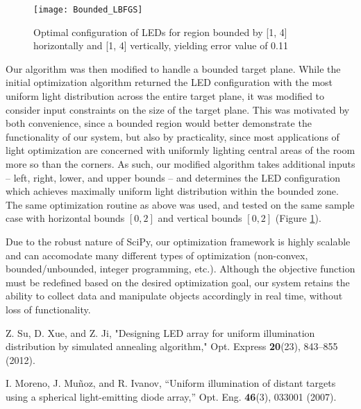 \documentclass[a4paper]{article}
\begin{document}
\begin{figure}[t]
    \centering
    \texttt{[image: Bounded\_LBFGS]}
    \caption{Optimal configuration of LEDs for region bounded by [1, 4] horizontally and [1, 4] vertically, yielding error value of 0.11}
    \label{bounded_solution}
\end{figure}

Our algorithm was then modified to handle a bounded target plane. While the initial optimization algorithm returned the LED configuration with the most uniform light distribution across the entire target plane, it was modified to consider input constraints on the size of the target plane. This was motivated by both convenience, since a bounded region would better demonstrate the functionality of our system, but also by practicality, since most applications of light optimization are concerned with uniformly lighting central areas of the room more so than the corners. As such, our modified algorithm takes additional inputs -- left, right, lower, and upper bounds -- and determines the LED configuration which achieves maximally uniform light distribution within the bounded zone. The same optimization routine as above was used, and tested on the same sample case with horizontal bounds $[0, 2]$ and vertical bounds $[0, 2]$ (Figure \ref{bounded_solution}).

Due to the robust nature of SciPy, our optimization framework is highly scalable and can accomodate many different types of optimization (non-convex, bounded/unbounded, integer programming, etc.). Although the objective function must be redefined based on the desired optimization goal, our system retains the ability to collect data and manipulate objects accordingly in real time, without loss of functionality.











\medskip
 
\begin{thebibliography}{2}

Z. Su, D. Xue, and Z. Ji, "Designing LED array for uniform illumination distribution by simulated annealing algorithm," Opt. Express \textbf{20}(23), 843–855 (2012).

I. Moreno, J. Muñoz, and R. Ivanov, “Uniform illumination of distant targets using a spherical light-emitting diode array,” Opt. Eng. \textbf{46}(3), 033001 (2007).

\end{thebibliography}
\end{document}
